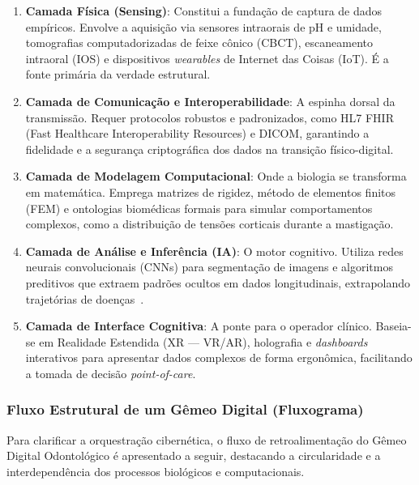 \begin{enumerate}
    \item \textbf{Camada Física (Sensing)}: Constitui a fundação de captura de dados empíricos. Envolve a aquisição via sensores intraorais de pH e umidade, tomografias computadorizadas de feixe cônico (CBCT), escaneamento intraoral (IOS) e dispositivos \textit{wearables} de Internet das Coisas (IoT). É a fonte primária da verdade estrutural.
    \item \textbf{Camada de Comunicação e Interoperabilidade}: A espinha dorsal da transmissão. Requer protocolos robustos e padronizados, como HL7 FHIR (Fast Healthcare Interoperability Resources) e DICOM, garantindo a fidelidade e a segurança criptográfica dos dados na transição físico-digital.
    \item \textbf{Camada de Modelagem Computacional}: Onde a biologia se transforma em matemática. Emprega matrizes de rigidez, método de elementos finitos (FEM) e ontologias biomédicas formais para simular comportamentos complexos, como a distribuição de tensões corticais durante a mastigação.
    \item \textbf{Camada de Análise e Inferência (IA)}: O motor cognitivo. Utiliza redes neurais convolucionais (CNNs) para segmentação de imagens e algoritmos preditivos que extraem padrões ocultos em dados longitudinais, extrapolando trajetórias de doenças~\cite{mdpi2025digital}.
    \item \textbf{Camada de Interface Cognitiva}: A ponte para o operador clínico. Baseia-se em Realidade Estendida (XR --- VR/AR), holografia e \textit{dashboards} interativos para apresentar dados complexos de forma ergonômica, facilitando a tomada de decisão \textit{point-of-care}.
\end{enumerate}

\subsubsection{Fluxo Estrutural de um Gêmeo Digital (Fluxograma)}

Para clarificar a orquestração cibernética, o fluxo de retroalimentação do Gêmeo Digital Odontológico é apresentado a seguir, destacando a circularidade e a interdependência dos processos biológicos e computacionais.

